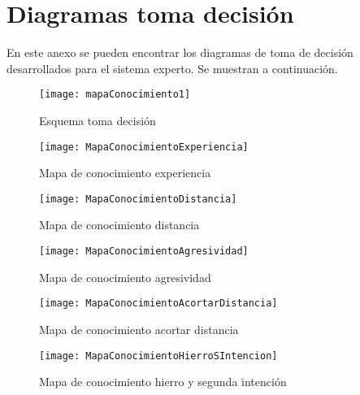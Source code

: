 \chapter{Diagramas toma decisión}
\label{cap:Diagramas toma decisión}

En este anexo se pueden encontrar los diagramas de toma de decisión desarrollados para el sistema
experto. Se muestran a continuación.

\begin{figure}[htb]
  \centering
    \texttt{[image: mapaConocimiento1]}
  \caption[Esquema toma decisión]{Esquema toma decisión}
  \label{fig:Esquema toma decisión anexo}
\end{figure}

\begin{figure}[htb]
  \centering
    \texttt{[image: MapaConocimientoExperiencia]}
  \caption[Mapa de conocimiento experiencia]{Mapa de conocimiento experiencia}
  \label{fig:Arbol decisión experiencia anexo}
\end{figure}

\begin{figure}[htb]
  \centering
    \texttt{[image: MapaConocimientoDistancia]}
  \caption[Mapa de conocimiento distancia]{Mapa de conocimiento distancia}
  \label{fig:Arbol decisión distancia anexo}
\end{figure}


\begin{figure}[htb]
  \centering
    \texttt{[image: MapaConocimientoAgresividad]}
  \caption[Mapa de conocimiento agresividad]{Mapa de conocimiento agresividad}
  \label{fig:Arbol decisión agresividad anexo}
\end{figure}


\begin{figure}[htb]
  \centering
    \texttt{[image: MapaConocimientoAcortarDistancia]}
  \caption[Mapa de conocimiento acortar distancia]{Mapa de conocimiento acortar distancia}
  \label{fig:Arbol decisión acortar distancia anexo}
\end{figure}


\begin{figure}[htb]
  \centering
    \texttt{[image: MapaConocimientoHierroSIntencion]}
  \caption[Mapa de conocimiento hierro y segunda intención]{Mapa de conocimiento hierro y segunda intención}
  \label{fig:Arbol decisión hierro y segunda intención anexo}
\end{figure}
